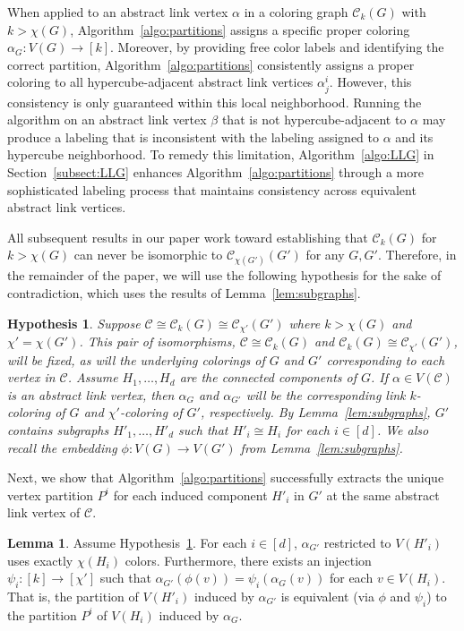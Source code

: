 \documentclass{amsart}
\theoremstyle{hypothesisstyle}
\newtheorem{hypothesis}{Hypothesis}
\theoremstyle{definition}
\newtheorem{lemma}[theorem]{Lemma}
\theoremstyle{remark}
\numberwithin{equation}{section}
\newcommand{\C}{\mathcal C}
\begin{document}
When applied to an abstract link vertex $\alpha$ in a coloring graph $\C_k(G)$ with $k>\chi(G)$,  Algorithm~\ref{algo:partitions} assigns a specific proper coloring $\alpha_G\colon V(G)\to [k]$. Moreover, by providing free color labels and identifying the correct partition, Algorithm~\ref{algo:partitions} consistently assigns a proper coloring to all hypercube-adjacent abstract link vertices $\alpha^i_j$. However, this consistency is only guaranteed within this local neighborhood. Running the algorithm on an abstract link vertex $\beta$ that is not hypercube-adjacent to $\alpha$ may produce a labeling that is inconsistent with the labeling assigned to $\alpha$ and its hypercube neighborhood. To remedy this limitation, Algorithm~\ref{algo:LLG} in Section~\ref{subsect:LLG} enhances Algorithm~\ref{algo:partitions} through a more sophisticated labeling process that maintains consistency across equivalent abstract link vertices.

All subsequent results in our paper work toward establishing that $\C_k(G)$ for $k>\chi(G)$ can never be isomorphic to $\C_{\chi(G')}(G')$ for any $G,G'$.  Therefore, in the remainder of the paper, we will use the following hypothesis for the sake of contradiction, which uses the results of Lemma~\ref{lem:subgraphs}.

\medskip

\begin{hypothesis}\label{hyp:running} Suppose $\C\cong \C_k(G)\cong \C_{\chi'}(G')$ where $k>\chi(G)$ and $\chi'=\chi(G')$. This pair of isomorphisms, $\C\cong \C_k(G)$ and $\C_k(G)\cong \C_{\chi'}(G')$, will be fixed, as will the underlying colorings of $G$ and $G'$ corresponding to each vertex in $\C$. Assume $H_1, \dots, H_d$ are the connected components of $G$. If $\alpha\in V(\C)$ is an abstract link vertex, then $\alpha_G$ and $\alpha_{G'}$ will be the corresponding link $k$-coloring of $G$ and $\chi'$-coloring of $G'$, respectively.  By Lemma~\ref{lem:subgraphs}, $G'$ contains subgraphs $H'_1, \dots, H'_d$ such that $H'_i\cong H_i$ for each $i\in [d]$. We also recall the embedding $\phi\colon V(G)\to V(G')$ from Lemma~\ref{lem:subgraphs}. 
\end{hypothesis}

\medskip  

Next, we show that Algorithm~\ref{algo:partitions} successfully extracts the unique vertex partition $P^i$ for each induced component $H'_i$ in $G'$ at the same abstract link vertex of $\mathcal{C}$. 

\begin{lemma}\label{lem:partition-G'}  Assume Hypothesis~\ref{hyp:running}. For each $i\in [d]$, $\alpha_{G'}$ restricted to $V(H'_i)$ uses exactly $\chi(H_i)$ colors. Furthermore, there exists an injection $\psi_i\colon [k]\to[\chi']$  such that $\alpha_{G'}\left(\phi(v)\right)=\psi_i(\alpha_{G}(v))$ for each $v\in V(H_i)$. That is, the partition of $V(H'_i)$ induced by $\alpha_{G'}$ is equivalent (via $\phi$ and $\psi_i$) to the partition $P^i$ of $V(H_i)$ induced by $\alpha_G$.
\end{lemma}
\end{document}
